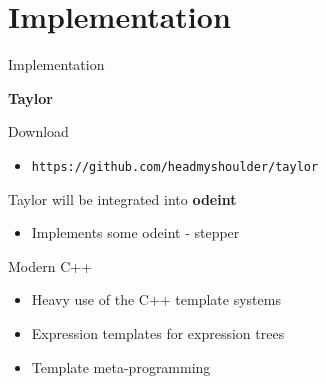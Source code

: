 \documentclass{beamer}
\begin{document}
\section{Implementation}



\frame{\tableofcontents[currentsection]}





\begin{frame}[fragile]{Implementation}

\centerline{\Large \bf \color{red}Taylor}

\vspace{2ex}

Download
\begin{itemize}
\item \texttt{https://github.com/headmyshoulder/taylor}
\end{itemize}

\pause

\vspace{2ex}

Taylor will be integrated into {\bf odeint}

\begin{itemize}
 \item Implements some odeint - stepper
\end{itemize}

\pause

\vspace{2ex}

Modern C++
\begin{itemize}
 \item Heavy use of the C++ template systems
 \item Expression templates for expression trees
 \item Template meta-programming 
\end{itemize}


\end{frame}
\end{document}
